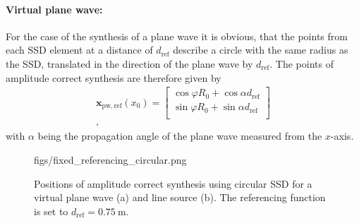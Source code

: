 \documentclass[12pt,a4paper]{article}
\newcommand{\sinfi}{\sin\varphi}
\newcommand{\cosfi}{\cos\varphi}
\newcommand{\dref}{d_{\mathrm{ref}}}
\begin{document}
\paragraph{Virtual plane wave:\\}
For the case of the synthesis of a plane wave it is obvious, that the points from each SSD element at a distance of $\dref$ describe a circle with the same radius as the SSD, translated in the direction of the plane wave by $\dref$. The points of amplitude correct synthesis are therefore given by
\begin{eqnarray}
\mathbf{x}_{\mathrm{pw,ref}}(x_0) =  \begin{bmatrix}  \cosfi R_0 + \cos\alpha \dref \\[0.3em] \sinfi R_0 + \sin \alpha \dref \\[0.3em]    \end{bmatrix} \\,
\label{Eq:Fixed_referencing_pw_circle}
\end{eqnarray}
with $\alpha$ being the propagation angle of the plane wave measured from the $x$-axis.

\begin{figure}
	\centering
	\begin{overpic}[width = 1\columnwidth]{figs/fixed_referencing_circular.png}
	\end{overpic}
\caption{ Positions of amplitude correct synthesis using circular SSD for a virtual plane wave (a) and line source (b). The referencing function is set to $\dref = 0.75~\mathrm{m}$. }
	\label{Fig:Theory:fixed_referencing_circular}
\end{figure}
\end{document}
